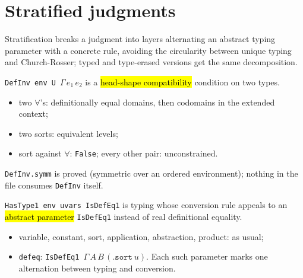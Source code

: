 \section{Stratified judgments}

Stratification breaks a judgment into layers alternating an abstract typing parameter with a
concrete rule, avoiding the circularity between unique typing and Church-Rosser; typed and
type-erased versions get the same decomposition.

\begin{definition}
\label{def:expb-definv}
\leanok
{}

 \texttt{DefInv env U}~$\Gamma\,e_1\,e_2$ is a \hl{head-shape compatibility}
condition on two types.
\begin{itemize}
\item two $\forall$'s: definitionally equal domains, then codomains in the extended context;
\item two sorts: equivalent levels;
\item sort against $\forall$: \texttt{False}; every other pair: unconstrained.
\end{itemize}
 \texttt{DefInv.symm} is proved (symmetric over an ordered environment); nothing in the
file consumes \texttt{DefInv} itself.
\end{definition}

\begin{definition}
\label{inductive:expb-hastype1}
\leanok
{}

 \texttt{HasType1 env uvars IsDefEq1} is typing whose conversion rule appeals to an
\hl{abstract parameter} \texttt{IsDefEq1} instead of real definitional equality.
\begin{itemize}
\item variable, constant, sort, application, abstraction, product: as usual;
\item \texttt{defeq}: \texttt{IsDefEq1}~$\Gamma\,A\,B\,(\mathtt{.sort}\ u)$. Each such parameter
marks one alternation between typing and conversion.
\end{itemize}
\end{definition}

